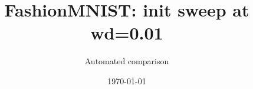 \documentclass[aspectratio=169]{beamer}
\title{FashionMNIST: init sweep at wd=0.01}
\author{Automated comparison}
\date{\today}
\begin{document}
\begin{frame}
    \titlepage
\end{frame}

\end{document}
